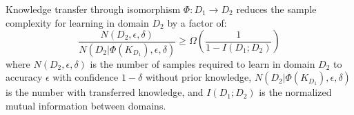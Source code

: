 \begin{theorem}
Knowledge transfer through isomorphism $\Phi: D_1 \to D_2$ reduces the sample complexity for learning in domain $D_2$ by a factor of:
\begin{equation}
\frac{N(D_2, \epsilon, \delta)}{N(D_2 | \Phi(K_{D_1}), \epsilon, \delta)} \geq \Omega\left(\frac{1}{1 - I(D_1; D_2)}\right)
\end{equation}
where $N(D_2, \epsilon, \delta)$ is the number of samples required to learn in domain $D_2$ to accuracy $\epsilon$ with confidence $1-\delta$ without prior knowledge, $N(D_2 | \Phi(K_{D_1}), \epsilon, \delta)$ is the number with transferred knowledge, and $I(D_1; D_2)$ is the normalized mutual information between domains.
\end{theorem}


